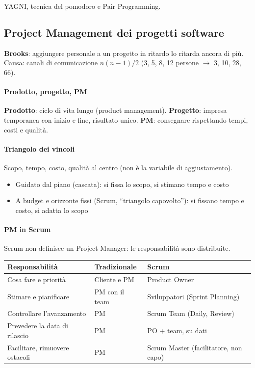 \documentclass[12pt]{extarticle}
\begin{document}
\noindent YAGNI, tecnica del pomodoro e Pair Programming.

\subsection{Project Management dei progetti software}
\textbf{Brooks}: aggiungere personale a un progetto in ritardo lo ritarda ancora di più. Causa: canali di comunicazione $n(n-1)/2$ (3, 5, 8, 12 persone $\rightarrow$ 3, 10, 28, 66).

\paragraph{Prodotto, progetto, PM} \textbf{Prodotto}: ciclo di vita lungo (product management). \textbf{Progetto}: impresa temporanea con inizio e fine, risultato unico. \textbf{PM}: consegnare rispettando tempi, costi e qualità.

\paragraph{Triangolo dei vincoli} Scopo, tempo, costo, qualità al centro (non è la variabile di aggiustamento).
\begin{itemize}
    \item Guidato dal piano (cascata): si fissa lo scopo, si stimano tempo e costo
    \item A budget e orizzonte fissi (Scrum, ``triangolo capovolto''): si fissano tempo e costo, si adatta lo scopo
\end{itemize}

\paragraph{PM in Scrum} Scrum non definisce un Project Manager: le responsabilità sono distribuite.
\begin{center}
\small
\begin{tabular}{p{5.0cm}p{3.2cm}p{5.4cm}}
    \toprule
    \textbf{Responsabilità} & \textbf{Tradizionale} & \textbf{Scrum} \\
    \midrule
    Cosa fare e priorità & Cliente e PM & Product Owner \\
    \addlinespace
    Stimare e pianificare & PM con il team & Sviluppatori (Sprint Planning) \\
    \addlinespace
    Controllare l'avanzamento & PM & Scrum Team (Daily, Review) \\
    \addlinespace
    Prevedere la data di rilascio & PM & PO + team, su dati \\
    \addlinespace
    Facilitare, rimuovere ostacoli & PM & Scrum Master (facilitatore, non capo) \\
    \bottomrule
\end{tabular}
\end{center}
\end{document}
